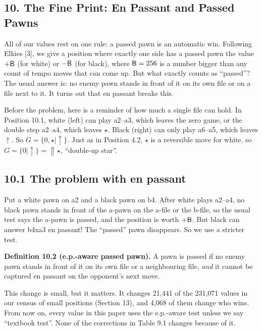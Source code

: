 \begin{center}
\section*{10. The Fine Print: En Passant and Passed Pawns}
\end{center}

\indent \indent All of our values rest on one rule: a passed pawn is an automatic win. Following Elkies [3], we
give a position where exactly one side has a passed pawn the value $+\mathsf{B}$ (for white) or $-\mathsf{B}$ (for black),
where $\mathsf{B} = 256$ is a number bigger than any count of tempo moves that can come up. But what exactly counts as
``passed''? The usual answer is: no enemy pawn stands in front of it on its own file or on a file next to it.
It turns out that en passant breaks this.


\indent Before the problem, here is a reminder of how much a single file can hold. In Position 10.1, white (left)
can play a2--a3, which leaves the zero game, or the double step a2--a4, which leaves $\star$. Black (right) can only
play a6--a5, which leaves $\uparrow$. So $G = \{0, \star \mid \uparrow\}$. Just as in Position 4.2, $\star$ is a
reversible move for white, so $G = \{0 \mid \uparrow\} = \Uparrow\star$, ``double-up star''.

\subsection*{10.1 The problem with en passant}

\indent Put a white pawn on a2 and a black pawn on b4. After white plays a2--a4, no black pawn stands in front
of the a-pawn on the a-file or the b-file, so the usual test says the a-pawn is passed, and the position is worth
$+\mathsf{B}$. But black can answer b4xa3 en passant! The ``passed'' pawn disappears. So we use a stricter test.

\indent \textbf{Definition 10.2 (e.p.-aware passed pawn).} A pawn is passed if no enemy pawn stands in front of
it on its own file or a neighbouring file, \emph{and} it cannot be captured en passant on the opponent's next
move.

\indent This change is small, but it matters. It changes 21,441 of the 231,071 values in our census of small
positions (Section 13), and 4,068 of them change who wins. From now on, every value in this paper uses the
e.p.-aware test unless we say ``textbook test''. None of the corrections in Table 9.1 changes because of it.

